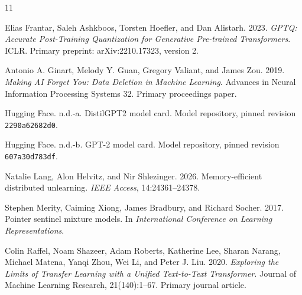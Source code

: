 \documentclass[11pt,a4paper]{article}
\def\href#1#2{{#2}}
\begin{document}
\begin{thebibliography}{11}

Elias Frantar, Saleh Ashkboos, Torsten Hoefler, and Dan Alistarh.
2023. \emph{GPTQ: Accurate Post-Training Quantization for Generative Pre-trained
Transformers}. ICLR. Primary preprint:
\href{https://arxiv.org/abs/2210.17323v2}{arXiv:2210.17323, version 2}.

Antonio A. Ginart, Melody Y. Guan, Gregory Valiant, and James Zou.
2019. \emph{Making AI Forget You: Data Deletion in Machine Learning}.
Advances in Neural Information Processing Systems 32.
\href{https://papers.nips.cc/paper_files/paper/2019/file/cb79f8fa58b91d3af6c9c991f63962d3-Paper.pdf}{Primary proceedings paper}.

Hugging Face. n.d.-a.
\href{https://huggingface.co/distilbert/distilgpt2/blob/2290a62682d06624634c1f46a6ad5be0f47f38aa/README.md}{DistilGPT2 model card}.
Model repository, pinned revision \nolinkurl{2290a62682d0}.

Hugging Face. n.d.-b.
\href{https://huggingface.co/openai-community/gpt2/blob/607a30d783dfa663caf39e06633721c8d4cfcd7e/README.md}{GPT-2 model card}.
Model repository, pinned revision \nolinkurl{607a30d783df}.

Natalie Lang, Alon Helvitz, and Nir Shlezinger. 2026.
\href{https://doi.org/10.1109/ACCESS.2026.3663428}{Memory-efficient distributed unlearning}.
\emph{IEEE Access}, 14:24361--24378.

Stephen Merity, Caiming Xiong, James Bradbury, and Richard Socher. 2017.
\href{https://openreview.net/pdf?id=Byj72udxe}{Pointer sentinel mixture models}.
In \emph{International Conference on Learning Representations}.

Colin Raffel, Noam Shazeer, Adam Roberts, Katherine Lee, Sharan Narang,
Michael Matena, Yanqi Zhou, Wei Li, and Peter J. Liu.
2020. \emph{Exploring the Limits of Transfer Learning with a Unified Text-to-Text
Transformer}. Journal of Machine Learning Research, 21(140):1--67.
\href{https://jmlr.org/papers/v21/20-074.html}{Primary journal article}.


\end{thebibliography}
\end{document}
